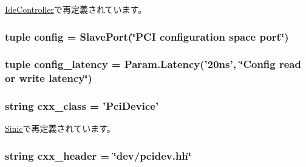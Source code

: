 \hyperlink{classIde_1_1IdeController_a36c5506122899541315d168541f135f6}{IdeController}で再定義されています。\hypertarget{classPci_1_1PciDevice_ad5f91786d7c873886a576621a2c1b0b5}{
\subsubsection[{config}]{\setlength{\rightskip}{0pt plus 5cm}tuple {\bf config} = {\bf SlavePort}(\char`\"{}PCI configuration space port\char`\"{})}}
\label{classPci_1_1PciDevice_ad5f91786d7c873886a576621a2c1b0b5}
\hypertarget{classPci_1_1PciDevice_a3b4bc49bf2cdc43fdd15ff76aa37a9fe}{
\subsubsection[{config\_\-latency}]{\setlength{\rightskip}{0pt plus 5cm}tuple {\bf config\_\-latency} = Param.Latency('20ns', \char`\"{}Config read or write latency\char`\"{})}}
\label{classPci_1_1PciDevice_a3b4bc49bf2cdc43fdd15ff76aa37a9fe}
\hypertarget{classPci_1_1PciDevice_a58cd55cd4023648e138237cfc0822ae3}{
\subsubsection[{cxx\_\-class}]{\setlength{\rightskip}{0pt plus 5cm}string {\bf cxx\_\-class} = '{\bf PciDevice}'}}
\label{classPci_1_1PciDevice_a58cd55cd4023648e138237cfc0822ae3}


\hyperlink{classEthernet_1_1Sinic_a58cd55cd4023648e138237cfc0822ae3}{Sinic}で再定義されています。\hypertarget{classPci_1_1PciDevice_a17da7064bc5c518791f0c891eff05fda}{
\subsubsection[{cxx\_\-header}]{\setlength{\rightskip}{0pt plus 5cm}string {\bf cxx\_\-header} = \char`\"{}dev/pcidev.hh\char`\"{}}}
\label{classPci_1_1PciDevice_a17da7064bc5c518791f0c891eff05fda}


